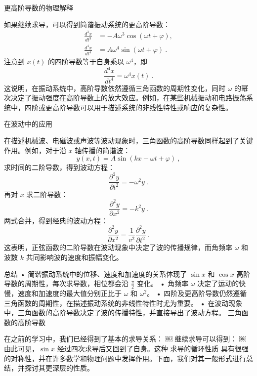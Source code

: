 更高阶导数的物理解释

如果继续求导，可以得到简谐振动系统的更高阶导数：
\begin{align*}
\frac{d^3x}{dt^3} &= -A\omega^3 \cos(\omega t + \varphi), \\
\frac{d^4x}{dt^4} &= A\omega^4 \sin(\omega t + \varphi)~.
\end{align*}
注意到 $x(t)$ 的四阶导数等于自身乘以 $\omega^4$，即
\begin{equation}
\frac{d^4x}{dt^4} = \omega^4 x(t)~.
\end{equation}
这说明，在振动系统中，高阶导数依然遵循三角函数的周期性变化，同时 $\omega$ 的幂次决定了振动强度在高阶导数上的放大效应。例如，在某些机械振动和电路振荡系统中，四阶或更高阶导数可以用于描述系统的非线性特性或响应的复杂性。

在波动中的应用

在描述机械波、电磁波或声波等波动现象时，三角函数的高阶导数同样起到了关键作用。例如，对于沿 $x$ 轴传播的简谐波：
\begin{equation}
y(x,t) = A \sin(kx - \omega t + \varphi)~,
\end{equation}
求时间的二阶导数，得到波动方程：
\begin{equation}
\frac{\partial^2 y}{\partial t^2} = -\omega^2 y~.
\end{equation}
再对 $x$ 求二阶导数：
\begin{equation}
\frac{\partial^2 y}{\partial x^2} = -k^2 y~.
\end{equation}
两式合并，得到经典的波动方程：
\begin{equation}
\frac{\partial^2 y}{\partial x^2} = \frac{1}{v^2} \frac{\partial^2 y}{\partial t^2}~.
\end{equation}
这表明，正弦函数的二阶导数在波动现象中决定了波的传播规律，而角频率 $\omega$ 和波数 $k$ 共同影响波的速度和振幅变化。

总结
	•	简谐振动系统中的位移、速度和加速度的关系体现了 $\sin x$ 和 $\cos x$ 高阶导数的周期性，每次求导数，相位都会沿 $\frac{\pi}{2}$ 变化。
	•	角频率 $\omega$ 决定了运动的快慢，速度和加速度的最大值分别正比于 $\omega$ 和 $\omega^2$。
	•	四阶及更高阶导数仍然遵循三角函数的周期性，在描述振动系统的非线性特性时尤为重要。
	•	在波动现象中，三角函数的高阶导数决定了波的传播特性，并直接导出了波动方程。
三角函数的高阶导数

在之前的学习中，我们已经得到了基本的求导关系：
￼
继续求导可以得到：
￼
由此可见，$\sin x$ 经过四次求导后又回到了自身。这种 求导的循环性质 具有很强的对称性，并在许多数学和物理问题中发挥作用。下面，我们对其一般形式进行总结，并探讨其更深层的性质。

